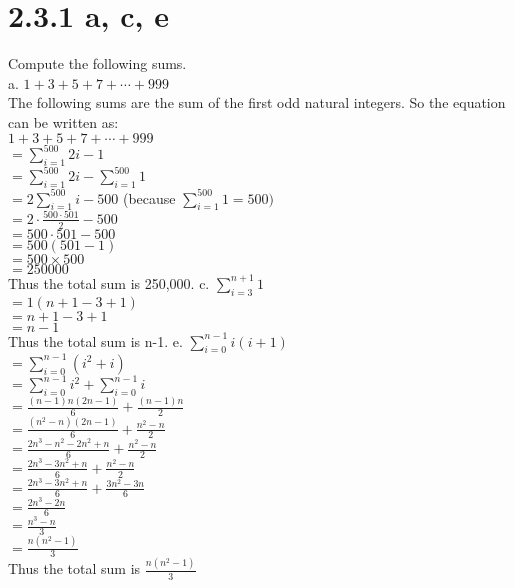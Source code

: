 \documentclass[8pt, letterpaper]{article}
\begin{document}
\section{2.3.1 a, c, e}
Compute the following sums. \\
\indent a. $1 + 3 + 5 + 7+ \cdots + 999$\\ 
\indent The following sums are the sum of the first odd natural integers. So the equation can be written as: \\
\indent $1 + 3 + 5 + 7+ \cdots + 999$ \\ 
\indent $= \sum\limits_{i=1}^{500} 2i-1$ \\ 
\indent $= \sum\limits_{i=1}^{500} 2i-\sum\limits_{i=1}^{500} 1$ \\ 
\indent $= 2 \sum\limits_{i=1}^{500} i - 500$ (because $\sum\limits_{i=1}^{500} 1 = 500)$ \\ 
\indent $= 2\cdot\frac{500\cdot501}{2} - 500$ \\ 
\indent $= 500\cdot501 - 500$ \\ 
\indent $= 500(501-1)$ \\ 
\indent $= 500 \times 500$ \\ 
\indent $= 250000$ \\
\indent Thus the total sum is 250,000. 
\newline
\indent c. $\sum\limits_{i=3}^{n+1} 1$ \\
\indent $= 1(n+1 - 3 + 1)$ \\
\indent $= n+1-3+1$ \\
\indent $= n - 1$ \\
\indent Thus the total sum is n-1. 
\newline
\indent e. $\sum\limits_{i=0}^{n-1} i(i+1)$ \\
\indent $= \sum\limits_{i=0}^{n-1} (i^2+i)$ \\
\indent $= \sum\limits_{i=0}^{n-1} i^2 + \sum\limits_{i=0}^{n-1} i$ \\
\indent $= \frac{(n-1)n(2n-1)}{6} + \frac{(n-1)n}{2}$ \\
\indent $= \frac{(n^2-n)(2n-1)}{6} + \frac{n^2-n}{2}$ \\
\indent $= \frac{2n^3-n^2-2n^2+n}{6} + \frac{n^2-n}{2}$ \\
\indent $= \frac{2n^3-3n^2+n}{6} + \frac{n^2-n}{2}$ \\
\indent $= \frac{2n^3-3n^2+n}{6} + \frac{3n^2-3n}{6}$ \\
\indent $= \frac{2n^3-2n}{6}$ \\
\indent $= \frac{n^3-n}{3}$ \\
\indent $= \frac{n(n^2-1)}{3}$ \\
\indent Thus the total sum is $\frac{n(n^2-1)}{3}$ 
\end{document}
